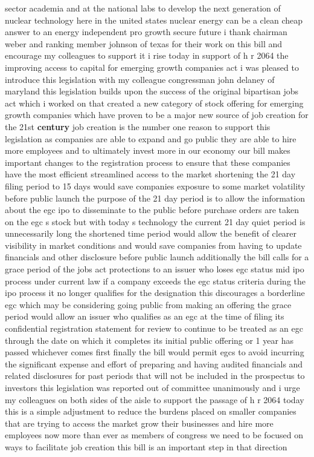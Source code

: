 \documentclass{article}
\begin{document}
sector academia and at the national labs to develop the next generation of nuclear technology here in the united states nuclear energy can be a clean cheap answer to an energy independent pro growth secure future i thank chairman weber and ranking member johnson of texas for their work on this bill and encourage my colleagues to support it
\vspace{8mm}
i rise today in support of h r 2064 the improving access to capital for emerging growth companies act i was pleased to introduce this legislation with my colleague congressman john delaney of maryland this legislation builds upon the success of the original bipartisan jobs act which i worked on that created a new category of stock offering for emerging growth companies which have proven to be a major new source of job creation for the 21st {\bf \color{red} century} job creation is the number one reason to support this legislation as companies are able to expand and go public they are able to hire more employees and to ultimately invest more in our economy our bill makes important changes to the registration process to ensure that these companies have the most efficient streamlined access to the market shortening the 21 day filing period to 15 days would save companies exposure to some market volatility before public launch the purpose of the 21 day period is to allow the information about the egc ipo to disseminate to the public before purchase orders are taken on the egc s stock but with today s technology the current 21 day quiet period is unnecessarily long the shortened time period would allow the benefit of clearer visibility in market conditions and would save companies from having to update financials and other disclosure before public launch additionally the bill calls for a grace period of the jobs act protections to an issuer who loses egc status mid ipo process under current law if a company exceeds the egc status criteria during the ipo process it no longer qualifies for the designation this discourages a borderline egc which may be considering going public from making an offering the grace period would allow an issuer who qualifies as an egc at the time of filing its confidential registration statement for review to continue to be treated as an egc through the date on which it completes its initial public offering or 1 year has passed whichever comes first finally the bill would permit egcs to avoid incurring the significant expense and effort of preparing and having audited financials and related disclosures for past periods that will not be included in the prospectus to investors this legislation was reported out of committee unanimously and i urge my colleagues on both sides of the aisle to support the passage of h r 2064 today this is a simple adjustment to reduce the burdens placed on smaller companies that are trying to access the market grow their businesses and hire more employees now more than ever as members of congress we need to be focused on ways to facilitate job creation this bill is an important step in that direction
\end{document}
